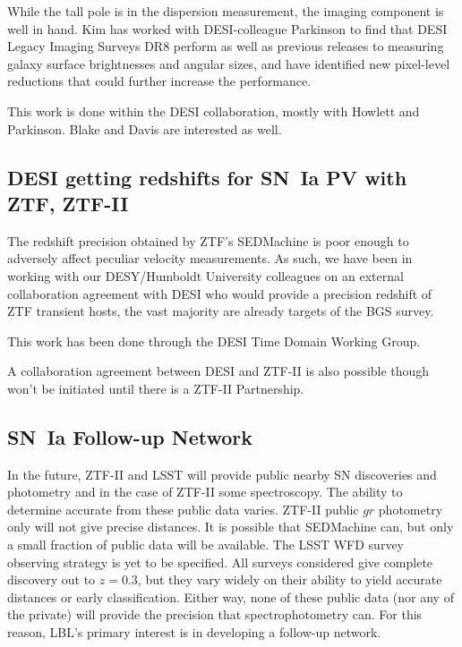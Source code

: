 While the tall pole is in the dispersion measurement, the
imaging component is well in hand. Kim has worked with DESI-colleague Parkinson to find that DESI Legacy Imaging Surveys DR8  perform
as well as previous releases to measuring galaxy surface brightnesses and angular sizes, and have identified new
pixel-level reductions that could further increase the performance.

This work is done within the DESI collaboration, mostly with Howlett and Parkinson.  Blake and Davis are interested as well.

\subsection{DESI getting redshifts for SN~Ia PV with ZTF, ZTF-II}
The redshift precision obtained by ZTF's SEDMachine is poor enough
to adversely affect peculiar velocity measurements.  As such, we have been in working with our DESY/Humboldt University
colleagues on an external collaboration agreement with DESI who would provide a precision redshift of ZTF transient hosts,
the vast majority are already targets of the BGS survey. 

This work has been done through the DESI Time Domain Working Group.

A collaboration agreement between DESI and ZTF-II is also possible though won't be initiated until there is a ZTF-II Partnership.

\subsection{SN~Ia Follow-up Network}
In the future, ZTF-II and LSST will provide public nearby SN discoveries and photometry and in the case of ZTF-II some spectroscopy.
The ability to determine accurate from these public data varies.  ZTF-II public $gr$ photometry only will not give precise distances.
It is possible that SEDMachine can, but only a small fraction of public data will be available.
The LSST WFD survey observing strategy is yet to be specified.  All surveys considered give complete discovery out to $z=0.3$, but
they vary widely on their ability to yield accurate distances or early classification.  Either way, none of these public data
(nor any of the private) will provide the precision that spectrophotometry can.  For this reason, LBL's primary interest
is in developing a follow-up network.

